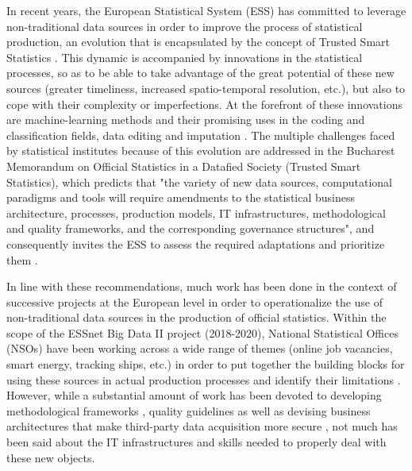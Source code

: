 In recent years, the European Statistical System (ESS) has committed to leverage non-traditional data sources in order to improve the process of statistical production, an evolution that is encapsulated by the concept of Trusted Smart Statistics \cite{ricciato2019trusted}. This dynamic is accompanied by innovations in the statistical processes, so as to be able to take advantage of the great potential of these new sources (greater timeliness, increased spatio-temporal resolution, etc.), but also to cope with their complexity or imperfections. At the forefront of these innovations are machine-learning methods and their promising uses in the coding and classification fields, data editing and imputation \cite{gjaltema2022high}. The multiple challenges faced by statistical institutes because of this evolution are addressed in the Bucharest Memorandum on Official Statistics in a Datafied Society (Trusted Smart Statistics), which predicts that "the variety of new data sources, computational paradigms and tools will require amendments to the statistical business architecture, processes, production models, IT infrastructures, methodological and quality frameworks, and the corresponding governance structures", and consequently invites the ESS to assess the required adaptations and prioritize them \cite{bucharest2018}.

In line with these recommendations, much work has been done in the context of successive projects at the European level in order to operationalize the use of non-traditional data sources in the production of official statistics. Within the scope of the ESSnet Big Data II project (2018-2020), National Statistical Offices (NSOs) have been working across a wide range of themes (online job vacancies, smart energy, tracking ships, etc.) in order to put together the building blocks for using these sources in actual production processes and identify their limitations \cite{essnetbigdata2}. However, while a substantial amount of work has been devoted to developing methodological frameworks \cite{descy2019towards, salgado2020mobile}, quality guidelines \cite{kowarik2022quality} as well as devising business architectures that make third-party data acquisition more secure \cite{ricciato2018processing}, not much has been said about the IT infrastructures and skills needed to properly deal with these new objects.

